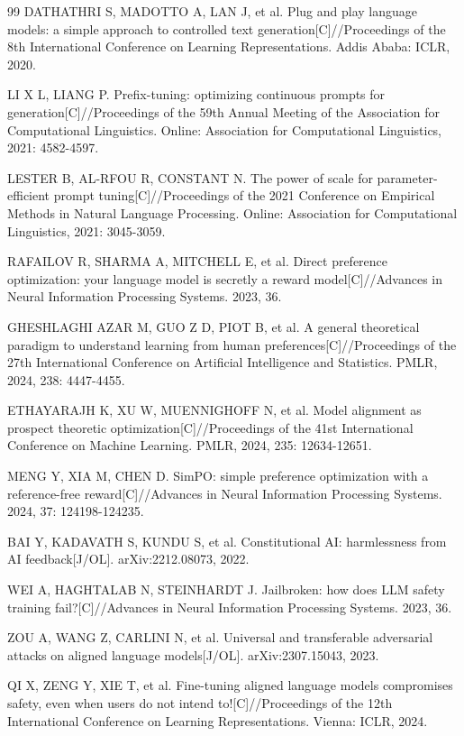 \documentclass[fontset=fandol,type=master,campus=shenzhen,etitleauto=true]{hithesisbook}
\begin{document}
\begin{thebibliography}{99}
 DATHATHRI S, MADOTTO A, LAN J, et al. Plug and play language models: a simple approach to controlled text generation[C]//Proceedings of the 8th International Conference on Learning Representations. Addis Ababa: ICLR, 2020.

 LI X L, LIANG P. Prefix-tuning: optimizing continuous prompts for generation[C]//Proceedings of the 59th Annual Meeting of the Association for Computational Linguistics. Online: Association for Computational Linguistics, 2021: 4582-4597.

 LESTER B, AL-RFOU R, CONSTANT N. The power of scale for parameter-efficient prompt tuning[C]//Proceedings of the 2021 Conference on Empirical Methods in Natural Language Processing. Online: Association for Computational Linguistics, 2021: 3045-3059.

 RAFAILOV R, SHARMA A, MITCHELL E, et al. Direct preference optimization: your language model is secretly a reward model[C]//Advances in Neural Information Processing Systems. 2023, 36.

 GHESHLAGHI AZAR M, GUO Z D, PIOT B, et al. A general theoretical paradigm to understand learning from human preferences[C]//Proceedings of the 27th International Conference on Artificial Intelligence and Statistics. PMLR, 2024, 238: 4447-4455.

 ETHAYARAJH K, XU W, MUENNIGHOFF N, et al. Model alignment as prospect theoretic optimization[C]//Proceedings of the 41st International Conference on Machine Learning. PMLR, 2024, 235: 12634-12651.

 MENG Y, XIA M, CHEN D. SimPO: simple preference optimization with a reference-free reward[C]//Advances in Neural Information Processing Systems. 2024, 37: 124198-124235.

 BAI Y, KADAVATH S, KUNDU S, et al. Constitutional AI: harmlessness from AI feedback[J/OL]. arXiv:2212.08073, 2022.

 WEI A, HAGHTALAB N, STEINHARDT J. Jailbroken: how does LLM safety training fail?[C]//Advances in Neural Information Processing Systems. 2023, 36.

 ZOU A, WANG Z, CARLINI N, et al. Universal and transferable adversarial attacks on aligned language models[J/OL]. arXiv:2307.15043, 2023.

 QI X, ZENG Y, XIE T, et al. Fine-tuning aligned language models compromises safety, even when users do not intend to![C]//Proceedings of the 12th International Conference on Learning Representations. Vienna: ICLR, 2024.


\end{thebibliography}
\end{document}
